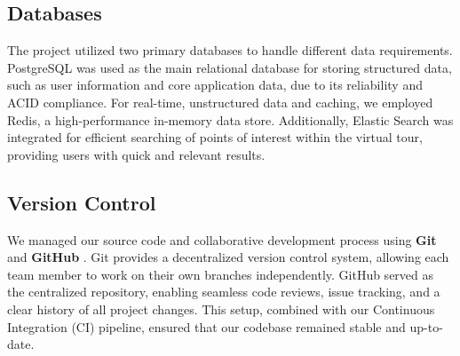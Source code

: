     \subsection{Databases}
        The project utilized two primary databases to handle different data requirements. PostgreSQL \cite{postgresql} was used as the main relational database for storing structured data, such as user information and core application data, due to its reliability and ACID \cite{mongodb_acid} compliance. For real-time, unstructured data and caching, we employed Redis, a high-performance in-memory data store. Additionally, Elastic Search was integrated for efficient searching of points of interest within the virtual tour, providing users with quick and relevant results.
    \subsection{Version Control}
        We managed our source code and collaborative development process using \textbf{Git} \cite{git} and \textbf{GitHub} \cite{github}. Git provides a decentralized version control system, allowing each team member to work on their own branches independently. GitHub served as the centralized repository, enabling seamless code reviews, issue tracking, and a clear history of all project changes. This setup, combined with our Continuous Integration (CI) pipeline, ensured that our codebase remained stable and up-to-date.






    
